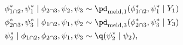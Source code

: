 \begin{align}
  \phi_{1 \cap 2}^{*}, \psi_{1}^{*} \mid \phi_{2 \cap 3}, \psi_{2}, \psi_{3} &\sim \pd_{\text{meld}, 1}(\phi_{1 \cap 2}^{*}, \psi_{1}^{*} \mid Y_{1}) \label{eqn:stage-two-proposals-one} \\
  \phi_{2 \cap 3}^{*}, \psi_{3}^{*} \mid \phi_{1 \cap 2}, \psi_{1}, \psi_{2} &\sim \pd_{\text{meld}, 3}(\phi_{2 \cap 3}^{*}, \psi_{3}^{*} \mid Y_{3}) \label{eqn:stage-two-proposals-two} \\
  \psi_{2}^{*} \mid \phi_{1 \cap 2}, \phi_{2 \cap 3}, \psi_{1}, \psi_{3} &\sim \q(\psi_{2}^{*} \mid \psi_{2}),
  \label{eqn:stage-two-proposals-three}
\end{align}